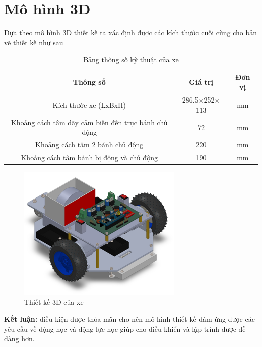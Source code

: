    \section{Mô hình 3D}
        \hspace*{0.6cm}Dựa theo mô hình 3D thiết kế ta xác định được các kích thước cuối cùng cho bản vẽ thiết kế như sau
         \begin{table}[h!]
            \centering
            \caption{Bảng thông số kỹ thuật của xe}
            \begin{tabular}{|c|c|c|}
                \hline
                \textbf{Thông số} & \textbf{Giá trị} & \textbf{Đơn vị} \\ \hline
                Kích thước xe (LxBxH) & 286.5$\times$252$\times$113 & mm \\ \hline
                Khoảng cách tâm dãy cảm biến đến trục bánh chủ động & 72 & mm \\ \hline
                Khoảng cách tâm 2 bánh chủ động & 220 & mm \\ \hline
                Khoảng cách tâm bánh bị động và chủ động & 190 & mm \\ \hline
            \end{tabular}
        \end{table}
        \begin{figure}[H]
            \centering
            \includegraphics[width=0.7\textwidth]{pictures/chapter3/3d.png}
            \caption{Thiết kế 3D của xe}
            \label{3d}
        \end{figure}
        \hspace*{0.6cm}\textbf{Kết luận:} điều kiện được thỏa mãn cho nên mô hình thiết kế đám ứng được các yêu cầu về động học và động lực học giúp cho điều khiển và lập trình được dễ dàng hơn.


